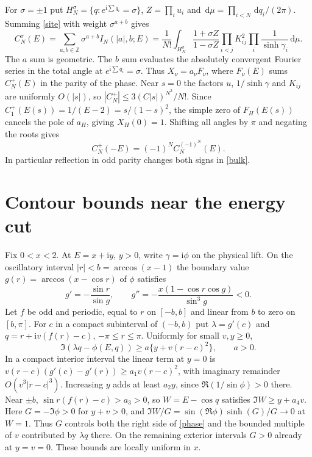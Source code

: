 \documentclass[11pt]{article}
\newcommand{\ii}{\mathrm i}
\newcommand{\dd}{\,\mathrm d}
\newcommand{\Z}{\mathbb Z}
\begin{document}
For $\sigma=\pm1$ put $H_N^\sigma=\{q:e^{\ii\sum q_i}=\sigma\}$,
$Z=\prod_i u_i$ and $\dd\mu=\prod_{i<N}\dd q_i/(2\pi)$.
Summing \eqref{site} with weight $\sigma^{a+b}$ gives
\begin{equation}\label{bulk}
 C_N^\sigma(E)=\sum_{a,b\in\Z}\sigma^{a+b}I_N(|a|,b;E)
 =\frac1{N!}\int_{H_N^\sigma}\frac{1+\sigma Z}{1-\sigma Z}
          \prod_{i<j}K_{ij}^2\prod_i\frac1{\sinh\gamma_i}\dd\mu .
\end{equation}
The $a$ sum is geometric. The $b$ sum evaluates the absolutely
convergent Fourier series in the total angle at $e^{\ii\sum q_i}=\sigma$.
Thus $X_\nu=a_\nu F_\nu$, where $F_\nu(E)$ sums $C_N^+(E)$ in
the parity of the phase. Near $s=0$ the factors $u$, $1/\sinh\gamma$ and
$K_{ij}$ are uniformly $O(|s|)$, so $|C_N^+|\le3(C|s|)^{N^2}/N!$.
Since $C_1^+(E(s))=1/(E-2)=s/(1-s)^2$, the simple zero of $F_H(E(s))$
cancels the pole of $a_H$, giving $X_H(0)=1$.
Shifting all angles by $\pi$ and negating the roots gives
\begin{equation}\label{reflect}
 C_N^+(-E)=(-1)^N C_N^{(-1)^N}(E).
\end{equation}
In particular reflection in odd parity changes both signs in \eqref{bulk}.

\section{Contour bounds near the energy cut}

Fix $0<x<2$. At $E=x+\ii y$, $y>0$, write $\gamma=\ii\phi$ on
the physical lift. On the oscillatory interval $|r|<b=\arccos(x-1)$
the boundary value $g(r)=\arccos(x-\cos r)$ of $\phi$ satisfies
\[
 g'=-\frac{\sin r}{\sin g},\qquad
 g''=-\frac{x(1-\cos r\cos g)}{\sin^3g}<0 .
\]
Let $f$ be odd and periodic, equal to $r$ on $[-b,b]$ and linear
from $b$ to zero on $[b,\pi]$. For $c$ in a compact subinterval of
$(-b,b)$ put $\lambda=g'(c)$ and $q=r+\ii v(f(r)-c)$,
$-\pi\le r\le\pi$. Uniformly for small $v,y\ge0$,
\begin{equation}\label{phase}
 \Im(\lambda q-\phi(E,q))\ge a\{y+v(r-c)^2\},\qquad a>0 .
\end{equation}
In a compact interior interval the linear term at $y=0$ is
$v(r-c)(g'(c)-g'(r))\ge a_1v(r-c)^2$, with imaginary remainder
$O(v^3|r-c|^3)$. Increasing $y$ adds at least $a_2y$, since
$\Re(1/\sin\phi)>0$ there. Near $\pm b$, $\sin r(f(r)-c)>a_3>0$,
so $W=E-\cos q$ satisfies $\Im W\ge y+a_4v$. Here $G=-\Im\phi>0$
for $y+v>0$, and $\Im W/G=\sin(\Re\phi)\sinh(G)/G\to0$ at $W=1$.
Thus $G$ controls both the right side of \eqref{phase} and the
bounded multiple of $v$ contributed by $\lambda q$ there. On the
remaining exterior intervals $G>0$ already at $y=v=0$. These bounds
are locally uniform in $x$.
\end{document}
